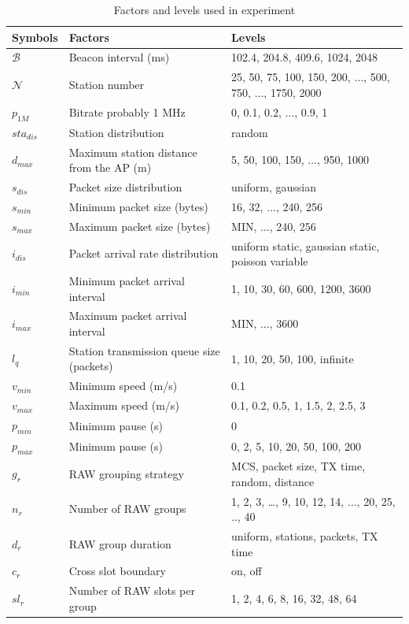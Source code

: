\begin{table}[t]
\centering
\renewcommand{\arraystretch}{1.2}
\scriptsize
\caption{Factors and levels used in experiment \label{tab:ns3 factors}}
\begin{tabular}{lll}
\hline
\textbf{Symbols}  & \textbf{Factors}            		 & \textbf{Levels}  \\
\hline
 $\mathcal{B}$ & Beacon interval (ms)            		        & 102.4, 204.8, 409.6, 1024, 2048  \\
 $\mathcal{N}$ & Station number              		        & 25, 50, 75, 100, 150, 200, $\dots$, 500, 750, $\dots$, 1750, 2000    \\
 $p_\textit{1M}$  & Bitrate probably 1 MHz                      & 0, 0.1, 0.2, $\dots$, 0.9, 1      \\  
 $sta_\textit{dis}$ & Station distribution         				& random \\
 $d_\textit{max}$ & Maximum station distance from the AP (m)       & 5, 50, 100, 150, $\dots$, 950, 1000 \\
 $s_\textit{dis}$ & Packet size distribution          & uniform, gaussian  \\
 $s_\textit{min}$ & Minimum packet size (bytes)       & 16, 32, $\dots$, 240, 256   \\
 $s_\textit{max}$ & Maximum packet size (bytes)       & MIN, $\dots$, 240, 256  \\
 $i_\textit{dis}$ & Packet arrival rate distribution  & uniform static, gaussian static, poisson variable\\
 $i_\textit{min}$ & Minimum packet arrival interval   & 1, 10, 30, 60, 600, 1200, 3600   \\
 $i_\textit{max}$ & Maximum packet arrival interval   & MIN, $\dots$, 3600  \\
 $l_q$ & Station transmission queue size (packets)   & 1, 10, 20, 50, 100, infinite   \\
  $\textit{v}_{min}$ & Minimum speed (m/s)     & 0.1 \\
 $\textit{v}_{max}$ & Maximum speed (m/s)     & 0.1,  0.2,  0.5,  1, 1.5,  2,  2.5, 3 \\
 $\textit{p}_{min}$ & Minimum pause (s)    & 0 \\
 $\textit{p}_{max}$ & Minimum pause (s)     & 0, 2, 5, 10, 20, 50, 100, 200  \\
 $g_r$ & RAW grouping strategy             & MCS, packet size, TX time, random, distance \\
 $n_r$ & Number of RAW groups              & 1, 2, 3, …, 9, 10, 12, 14, $\dots$, 20, 25, .., 40  \\
 $d_r$ & RAW group duration                & uniform, stations, packets, TX time  \\
 $c_r$ & Cross slot boundary               & on, off \\
 $\textit{sl}_r$ & Number of RAW slots per group     & 1, 2, 4, 6, 8, 16, 32, 48, 64 \\
\hline
\end{tabular}
\end{table}


